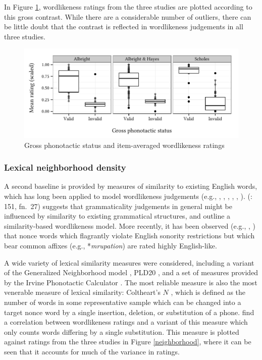 In Figure \ref{boxplot}, wordlikeness ratings from the three studies are plotted according to this gross contrast. While there are a considerable number of outliers, there can be little doubt that the contrast is reflected in wordlikeness judgements in all three studies.

\begin{figure}[ht]
\centering
\includegraphics{boxplot.pdf}
\caption{Gross phonotactic status and item-averaged wordlikeness ratings}
\label{boxplot}
\end{figure}

\subsubsection{Lexical neighborhood density}

A second baseline is provided by measures of similarity to existing English words, which has long been applied to model wordlikeness judgements (e.g., \citealt{Bailey2001}, \citealt{Greenberg1964}, \citealt{Kirby2007}, \citealt{Ohala1986b}, \citealt{Shademan2006,Shademan2007}, \citealt{Vitevitch1998,Vitevitch1999a}). \citeauthor{LSLT} (\citeyear{LSLT}: 151, fn.~27) suggests that grammaticality judgements in general might be influenced by similarity to existing grammatical structures, and \citet[417f.]{SPE} outline a similarity-based wordlikeness model. More recently, it has been observed (e.g., \citealt[51]{Coleman1997}, \citealt{Hay2004a}) that nonce words which flagrantly violate English sonority restrictions but which bear common affixes (e.g., *\emph{mrupation}) are rated highly English-like.

A wide variety of lexical similarity measures were considered, including a variant of the Generalized Neighborhood model \citep{Bailey2001}, PLD20 \citep{Suarez2011}, and a set of measures provided by the Irvine Phonotactic Calculator \citep{Vaden2009}. The most reliable measure is also the most venerable measure of lexical similarity: Coltheart's $N$ \citep{Coltheart1977}, which is defined as the number of words in some representative sample which can be changed into a target nonce word by a single insertion, deletion, or substitution of a phone. \citet{Greenberg1964} find a correlation between wordlikeness ratings and a variant of this measure which only counts words differing by a single substitution. This measure is plotted against ratings from the three studies in Figure \ref{neighborhood}, where it can be seen that it accounts for much of the variance in ratings.

